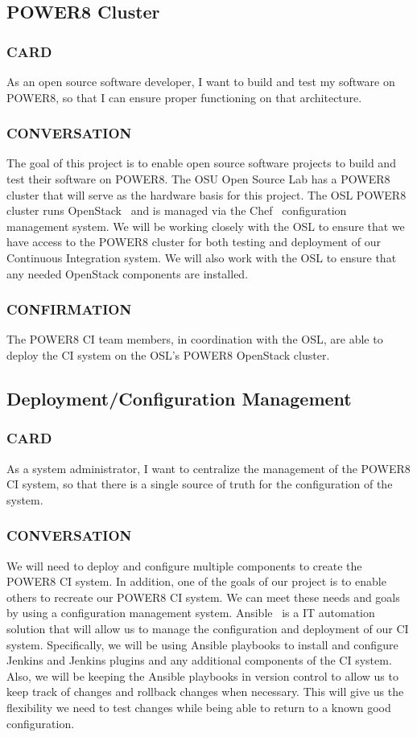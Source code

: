 \documentclass[10pt,letterpaper,onecolumn,journal]{IEEEtran}
\begin{document}
\subsection{POWER8 Cluster}
\subsubsection{CARD}
As an open source software developer, I want to build and test my software on POWER8, so that I can ensure proper functioning on that architecture.
\subsubsection{CONVERSATION}
The goal of this project is to enable open source software projects to build and test their software on POWER8.
The OSU Open Source Lab has a POWER8 cluster that will serve as the hardware basis for this project.
The OSL POWER8 cluster runs OpenStack~\cite{openstackmain} and is managed via the Chef~\cite{chefmain} configuration management system.
We will be working closely with the OSL to ensure that we have access to the POWER8 cluster for both testing and deployment of our Continuous Integration system.
We will also work with the OSL to ensure that any needed OpenStack components are installed.
\subsubsection{CONFIRMATION}
The POWER8 CI team members, in coordination with the OSL, are able to deploy the CI system on the OSL's POWER8 OpenStack cluster.

\subsection{Deployment/Configuration Management}
\subsubsection{CARD}
As a system administrator, I want to centralize the management of the POWER8 CI system, so that there is a single source of truth for the configuration of the system.
\subsubsection{CONVERSATION}
We will need to deploy and configure multiple components to create the POWER8 CI system.
In addition, one of the goals of our project is to enable others to recreate our POWER8 CI system.
We can meet these needs and goals by using a configuration management system.
Ansible~\cite{ansiblemain} is a IT automation solution that will allow us to manage the configuration and deployment of our CI system.
Specifically, we will be using Ansible playbooks to install and configure Jenkins and Jenkins plugins and any additional components of the CI system.
Also, we will be keeping the Ansible playbooks in version control to allow us to keep track of changes and rollback changes when necessary.
This will give us the flexibility we need to test changes while being able to return to a known good configuration.
\end{document}

